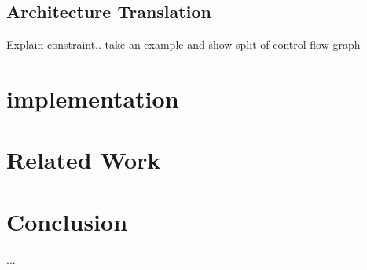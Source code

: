 \documentclass[10pt,sigconf,letterpaper,anonymous]{acmart}
\begin{document}
\subsection{Architecture Translation}
Explain constraint.. take an example and show split of control-flow graph



\section{implementation}

\section{Related Work}

\section{Conclusion}

\begin{acks}
...
\end{acks}




\end{document}
